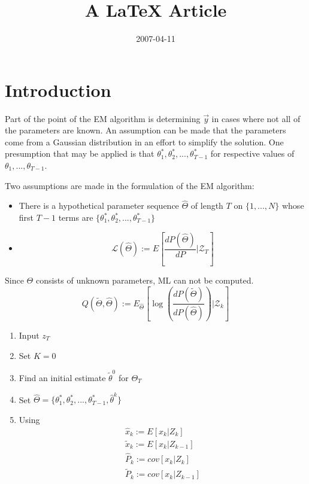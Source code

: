 \documentclass[]{article}
\title{A LaTeX Article}
\author{  }
\date{2007-04-11}
\begin{document}
\ifpdf
{}
\else
{}
\fi

\maketitle


\begin{abstract}
\end{abstract}

\section{Introduction}

Part of the point of the EM algorithm is determining $\vec{y}$ in cases where not all of the parameters are known.  An assumption can be made that the parameters come from a Gaussian distribution in an effort to simplify the solution.   One presumption that may be applied is that $\theta_1 ^* , \theta_2 ^*, ..., \theta_{T-1}^* $ for respective values of $\theta_1, ..., \theta_{T-1}$.  

Two assumptions are made in the formulation of the EM algorithm: 
\begin{itemize}
	\item There is a hypothetical parameter sequence $\hat{\Theta}$ of length $T$ on $\{ 1, ..., N\}$ whose first $T-1$ terms are $\{\theta_1 ^*, \theta_2 ^*, ..., \theta_{T-1} ^* \}$
	\item 
	\[
	\mathcal{L}( \hat{\Theta}) := E [ \frac{dP( \hat{\Theta})}{ dP } | \mathcal{Z}_T ]
	\]
\end{itemize}
Since $\Theta$ consists of unknown parameters, ML can not be computed.  
\[
	Q ( \tilde{\Theta} , \hat{\Theta}) := E_{\hat{\Theta}}[ \log (\frac{dP(\tilde{\Theta})}{ dP(\hat{\Theta})  } ) | \mathcal{Z}_k]
\]

\begin{enumerate}
	\item Input $z_T$
	\item Set $K=0$
	\item Find an initial estimate $\tilde{\theta}^0$ for $\Theta_T$
	\item Set $\hat{\Theta} = \{\theta_1 ^* , \theta_2^*, ..., \theta_{T-1}^*, \hat{\theta}^k  \}$
	\item Using 
	\begin{eqnarray*}
		\hat{x}_k := E[ x_k | Z_k] \\
		\tilde{x}_k := E [ x_k | Z_{k-1}] \\
		\hat{P}_k := cov [x_k | Z_k] \\
		\tilde{P}_k := cov [x_k | Z_{k-1}]
	\end{eqnarray*}
	
\end{enumerate}



\end{document}
